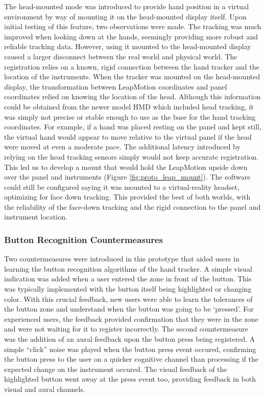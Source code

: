 The head-mounted mode was introduced to provide hand position in a virtual environment by way of mounting it on the head-mounted display itself.
Upon initial testing of this feature, two observations were made.
The tracking was much improved when looking down at the hands, seemingly providing more robust and reliable tracking data.
However, using it mounted to the head-mounted display caused a larger disconnect between the real world and physical world.
The registration relies on a known, rigid connection between the hand tracker and the location of the instruments.
When the tracker was mounted on the head-mounted display, the transformation between LeapMotion coordinates and panel coordinates relied on knowing the location of the head.
Although this information could be obtained from the newer model HMD which included head tracking, it was simply not precise or stable enough to use as the base for the hand tracking coordinates.
For example, if a hand was placed resting on the panel and kept still, the virtual hand would appear to move relative to the virtual panel if the head were moved at even a moderate pace.
The additional latency introduced by relying on the head tracking sensors simply would not keep accurate registration.
This led us to develop a mount that would hold the LeapMotion upside down over the panel and instruments (Figure \ref{fig:proto_leap_mount}).
The software could still be configured saying it was mounted to a virtual-reality headset, optimizing for face down tracking.
This provided the best of both worlds, with the reliability of the face-down tracking and the rigid connection to the panel and instrument location.

\subsubsection{Button Recognition Countermeasures}

Two countermeasures were introduced in this prototype that aided users in learning the button recognition algorithms of the hand tracker.
A simple visual indication was added when a user entered the zone in front of the button.
This was typically implemented with the button itself being highlighted or changing color.
With this crucial feedback, new users were able to learn the tolerances of the button zone and understand when the button was going to be `pressed'.
For experienced users, the feedback provided confirmation that they were in the zone and were not waiting for it to register incorrectly.
The second countermeasure was the addition of an aural feedback upon the button press being registered.
A simple ``click'' noise was played when the button press event occured, confirming the button press to the user on a quicker cognitive channel than processing if the expected change on the instrument occured.
The visual feedback of the highlighted button went away at the press event too, providing feedback in both visual and aural channels.

